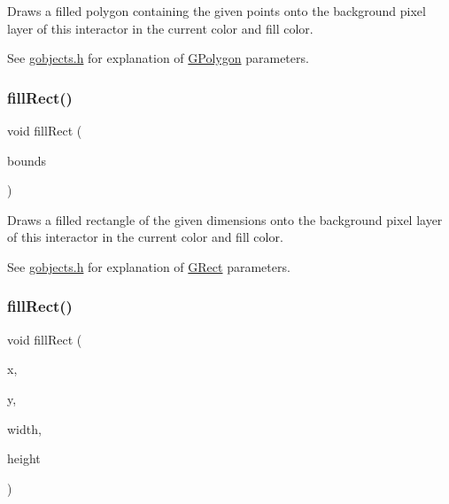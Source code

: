 Draws a filled polygon containing the given points onto the background pixel layer of this interactor in the current color and fill color. 

See \mbox{\hyperlink{gobjects_8h_source}{gobjects.\+h}} for explanation of \mbox{\hyperlink{classGPolygon}{G\+Polygon}} parameters. \mbox{\label{classGDrawingSurface_ae6582295003bf2488836b1993dadbad7}} 
\subsubsection{\texorpdfstring{fill\+Rect()}{fillRect()}\hspace{0.1cm}{\footnotesize\ttfamily [1/2]}}
{\footnotesize\ttfamily void fill\+Rect (\begin{DoxyParamCaption}\item[{const \mbox{\hyperlink{structGRectangle}{G\+Rectangle}} \&}]{bounds }\end{DoxyParamCaption})\hspace{0.3cm}{\ttfamily [virtual]}}



Draws a filled rectangle of the given dimensions onto the background pixel layer of this interactor in the current color and fill color. 

See \mbox{\hyperlink{gobjects_8h_source}{gobjects.\+h}} for explanation of \mbox{\hyperlink{classGRect}{G\+Rect}} parameters. \mbox{\label{classGDrawingSurface_aac3ae7d3aee950de78eca0e108352254}} 
\subsubsection{\texorpdfstring{fill\+Rect()}{fillRect()}\hspace{0.1cm}{\footnotesize\ttfamily [2/2]}}
{\footnotesize\ttfamily void fill\+Rect (\begin{DoxyParamCaption}\item[{double}]{x,  }\item[{double}]{y,  }\item[{double}]{width,  }\item[{double}]{height }\end{DoxyParamCaption})\hspace{0.3cm}{\ttfamily [virtual]}}



